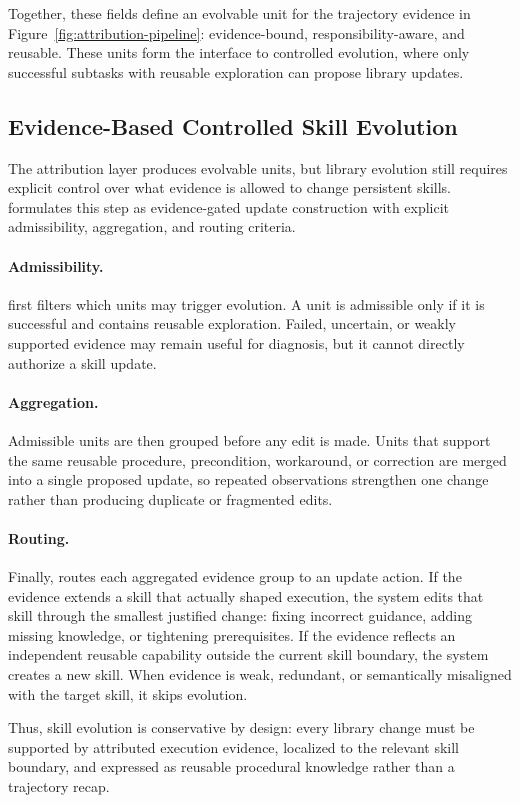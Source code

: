Together, these fields define an evolvable unit for the trajectory evidence in Figure~\ref{fig:attribution-pipeline}: evidence-bound, responsibility-aware, and reusable. These units form the interface to controlled evolution, where only successful subtasks with reusable exploration can propose library updates.

\subsection{Evidence-Based Controlled Skill Evolution}

The attribution layer produces evolvable units, but library evolution still requires explicit control over what evidence is allowed to change persistent skills. \ours formulates this step as evidence-gated update construction with explicit admissibility, aggregation, and routing criteria.

\paragraph{Admissibility.} \ours first filters which units may trigger evolution. A unit is admissible only if it is successful and contains reusable exploration. Failed, uncertain, or weakly supported evidence may remain useful for diagnosis, but it cannot directly authorize a skill update.
\paragraph{Aggregation.} Admissible units are then grouped before any edit is made. Units that support the same reusable procedure, precondition, workaround, or correction are merged into a single proposed update, so repeated observations strengthen one change rather than producing duplicate or fragmented edits.
\paragraph{Routing.} Finally, \ours routes each aggregated evidence group to an update action. If the evidence extends a skill that actually shaped execution, the system edits that skill through the smallest justified change: fixing incorrect guidance, adding missing knowledge, or tightening prerequisites. If the evidence reflects an independent reusable capability outside the current skill boundary, the system creates a new skill. When evidence is weak, redundant, or semantically misaligned with the target skill, it skips evolution.

Thus, skill evolution is conservative by design: every library change must be supported by attributed execution evidence, localized to the relevant skill boundary, and expressed as reusable procedural knowledge rather than a trajectory recap.
